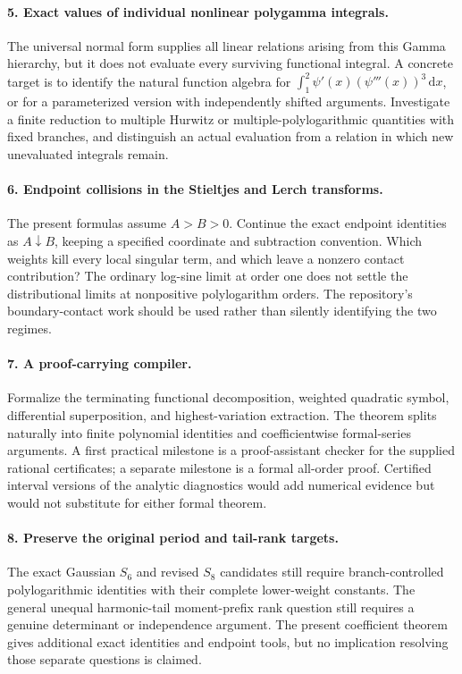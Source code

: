 \documentclass[11pt,letterpaper]{article}
\numberwithin{equation}{section}
\theoremstyle{definition}\newtheorem{definition}[theorem]{Definition}
\theoremstyle{remark}\newtheorem{remark}[theorem]{Remark}
\newcommand{\dd}{\,\mathrm d}\newcommand{\ii}{\mathrm i}
\begin{document}
\paragraph{5. Exact values of individual nonlinear polygamma integrals.}
The universal normal form supplies all linear relations arising from
this Gamma hierarchy, but it does not evaluate every surviving
functional integral. A concrete target is to identify the natural
function algebra for
$\int_1^2\psi'(x)(\psi'''(x))^3\dd x$, or for a parameterized version
with independently shifted arguments. Investigate a finite reduction
to multiple Hurwitz or multiple-polylogarithmic quantities with fixed
branches, and distinguish an actual evaluation from a relation in
which new unevaluated integrals remain.

\paragraph{6. Endpoint collisions in the Stieltjes and Lerch transforms.}
The present formulas assume $A>B>0$. Continue the exact endpoint
identities as $A\downarrow B$, keeping a specified coordinate and
subtraction convention. Which weights kill every local singular term,
and which leave a nonzero contact contribution? The ordinary log-sine
limit at order one does not settle the distributional limits at
nonpositive polylogarithm orders. The repository's boundary-contact
work should be used rather than silently identifying the two regimes.

\paragraph{7. A proof-carrying compiler.}
Formalize the terminating functional decomposition, weighted quadratic
symbol, differential superposition, and highest-variation extraction.
The theorem splits naturally into finite polynomial identities and
coefficientwise formal-series arguments. A first practical milestone
is a proof-assistant checker for the supplied rational certificates;
a separate milestone is a formal all-order proof. Certified interval
versions of the analytic diagnostics would add numerical evidence but
would not substitute for either formal theorem.

\paragraph{8. Preserve the original period and tail-rank targets.}
The exact Gaussian $S_6$ and revised $S_8$ candidates still require
branch-controlled polylogarithmic identities with their complete
lower-weight constants. The general unequal harmonic-tail moment-prefix
rank question still requires a genuine determinant or independence
argument. The present coefficient theorem gives additional exact
identities and endpoint tools, but no implication resolving those
separate questions is claimed.
\end{document}
